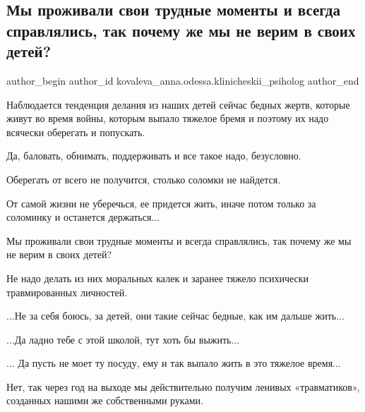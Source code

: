  
 
 
 
 

\subsection{Мы проживали свои трудные моменты и всегда справлялись, так почему же мы не верим в своих детей?}
\label{sec:30_09_2022.fb.kovaleva_anna.odessa.klinicheskii_psiholog.1.mi_prozhivali_svoi_t}

\ifcmt
 author_begin
   author_id kovaleva_anna.odessa.klinicheskii_psiholog
 author_end
\fi

Наблюдается тенденция делания из наших детей сейчас бедных жертв, которые живут
во время войны, которым выпало тяжелое бремя и поэтому их надо всячески
оберегать и попускать.

Да, баловать, обнимать, поддерживать и все такое надо, безусловно.

Оберегать от всего не получится, столько соломки не найдется.

От самой жизни не уберечься, ее придется жить, иначе потом только за соломинку
и останется держаться...

Мы проживали свои трудные моменты и всегда справлялись, так почему же мы не
верим в своих детей?

Не надо делать из них моральных калек и заранее тяжело психически
травмированных личностей.

...Не за себя боюсь, за детей, они такие сейчас бедные, как им дальше жить...

...Да ладно тебе с этой школой, тут хоть бы выжить...

... Да пусть не моет ту посуду, ему и так выпало жить в это тяжелое время...

Нет, так через год на выходе мы действительно получим ленивых «травматиков»,
созданных нашими же собственными руками.

